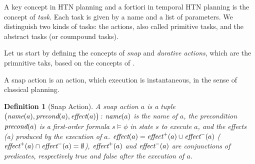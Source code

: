\documentclass[letterpaper]{article} %
\newtheorem{definition}{Definition}
\newcommand{\name}{\text{\it name}}
\newcommand{\pre}{\text{\it precond}}
\newcommand{\effect}{\text{\it effect}}
\newcommand{\add}{\text{\it effect}^{+}}
\newcommand{\del}{\text{\it effect}^{-}}
\begin{document}

 A key concept in HTN planning and a fortiori in temporal HTN planning is the concept of {\it task}. Each task is given by a name and a list of parameters. We distinguish two kinds of tasks: the actions, also called primitive tasks, and the abstract tasks (or coumpound tasks).


 Let us start by defining the concepts of {\it snap} and {\it durative actions}, which are the primnitive taks, based on the concepts of \cite{abdulaziz22}.

A snap action is an action, which execution is instantaneous, in the sense of classical planning. %
\begin{definition}[Snap Action] A {\em snap action} $a$ is a tuple $\bigl(\name(a), \pre(a), \effect(a) \bigr)$: $\name(a)$ is the name of $a$, the precondition $\pre(a)$ is a first-order formula $s \models \phi$ in state $s$ to execute $a$, and the effects \effect(a) produced by the execution of $a$. $\effect(a) = \add(a) \cup \del(a)$ ($\add(a) \cap \del(a) = \emptyset$), $\add(a)$ and $\del(a)$ are conjunctions of predicates, respectively true and false after the execution of $a$.
\end{definition}
\end{document}
